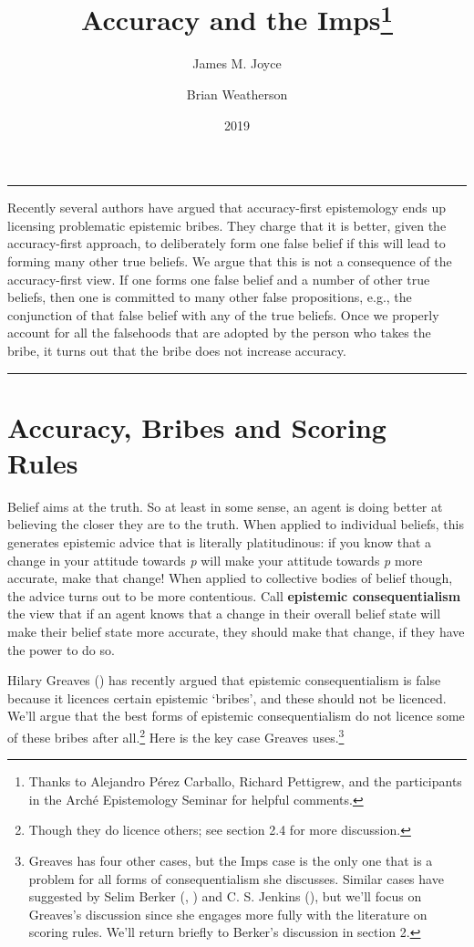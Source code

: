 \documentclass[
  11pt,
  letterpaper,
  DIV=11,
  numbers=noendperiod,
  twoside]{scrartcl}
\title{Accuracy and the Imps\thanks{Thanks to Alejandro Pérez Carballo,
Richard Pettigrew, and the participants in the Arché Epistemology
Seminar for helpful comments.}}
\author{James M. Joyce \and Brian Weatherson}
\date{2019}
\renewenvironment{abstract}
 {\vspace{-1.25cm}
 \quotation\small\noindent\rule{\linewidth}{.5pt}\par\smallskip
 \noindent }
 {\par\noindent\rule{\linewidth}{.5pt}\endquotation}
\begin{document}
\maketitle
\begin{abstract}
Recently several authors have argued that accuracy-first epistemology
ends up licensing problematic epistemic bribes. They charge that it is
better, given the accuracy-first approach, to deliberately form one
false belief if this will lead to forming many other true beliefs. We
argue that this is not a consequence of the accuracy-first view. If one
forms one false belief and a number of other true beliefs, then one is
committed to many other false propositions, e.g., the conjunction of
that false belief with any of the true beliefs. Once we properly account
for all the falsehoods that are adopted by the person who takes the
bribe, it turns out that the bribe does not increase accuracy.
\end{abstract}


\section{Accuracy, Bribes and Scoring
Rules}\label{accuracybribesandscoringrules}

Belief aims at the truth. So at least in some sense, an agent is doing
better at believing the closer they are to the truth. When applied to
individual beliefs, this generates epistemic advice that is literally
platitudinous: if you know that a change in your attitude towards
\emph{p} will make your attitude towards \emph{p} more accurate, make
that change! When applied to collective bodies of belief though, the
advice turns out to be more contentious. Call \textbf{epistemic
consequentialism} the view that if an agent knows that a change in their
overall belief state will make their belief state more accurate, they
should make that change, if they have the power to do so.

Hilary Greaves () has recently argued
that epistemic consequentialism is false because it licences certain
epistemic `bribes', and these should not be licenced. We'll argue that
the best forms of epistemic consequentialism do not licence some of
these bribes after all.\footnote{Though they do licence others; see
  section 2.4 for more discussion.} Here is the key case Greaves
uses.\footnote{Greaves has four other cases, but the Imps case is the
  only one that is a problem for all forms of consequentialism she
  discusses. Similar cases have suggested by Selim Berker
  (, )
  and C. S. Jenkins (), but we'll focus
  on Greaves's discussion since she engages more fully with the
  literature on scoring rules. We'll return briefly to Berker's
  discussion in section 2.}
\end{document}

